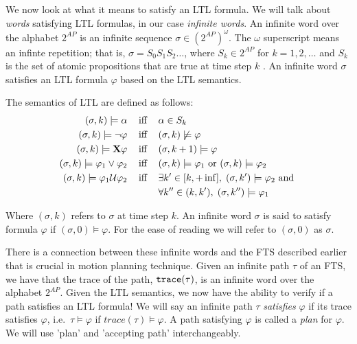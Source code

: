 We now look at what it means to satisfy an LTL formula. We will talk about \textit{words} satisfying LTL formulas, in our case \textit{infinite words}. An infinite word over the alphabet $2^{AP}$ is an infinite sequence $\sigma \in (2^{AP})^\omega$. The $\omega$ superscript means an infinte repetition; that is, $\sigma = S_0 S_1 S_2 \dots$, where $S_k \in 2^{AP}$ for $k=1,2,\dots$ and $S_k$ is the set of atomic propositions that are true at time step $k$ \cite{guo15}. An infinite word $\sigma$ satisfies an LTL formula $\varphi$ based on the LTL semantics.  

\theoremstyle{definition}
\begin{definition}
\label{defLTLS}
The semantics of LTL are defined as follows:
\begin{align*}
(\sigma,k) \models \alpha \hspace{0.3cm}\text{ iff }\hspace{0.3cm}& \alpha \in S_k \\
(\sigma,k) \models \neg \varphi \hspace{0.3cm}\text{ iff }\hspace{0.3cm}& (\sigma, k) \not \models \varphi \\
(\sigma,k) \models \textbf{X} \varphi \hspace{0.3cm}\text{ iff }\hspace{0.3cm}& (\sigma, k+1) \models \varphi \\
(\sigma,k) \models \varphi_1 \lor \varphi_2 \hspace{0.3cm}\text{ iff }\hspace{0.3cm}& (\sigma,k) \models \varphi_1 \text{ or } (\sigma,k) \models \varphi_2 \\
(\sigma,k) \models \varphi_1 \mathcal{U} \varphi_2 \hspace{0.3cm}\text{ iff }\hspace{0.3cm}& \exists k' \in [k,+\inf ], \hspace{0.1cm} (\sigma ,k') \models \varphi_2 \text{ and } \\ &\forall k'' \in (k,k'), \hspace{0.1cm} (\sigma, k'') \models \varphi_1 
\end{align*}
\end{definition}
Where $(\sigma,k)$  refers to $\sigma$ at time step $k$. An infinite word $\sigma$ is said to satisfy formula $\varphi$ if $(\sigma,0) \models \varphi$. For the ease of reading we will refer to $(\sigma,0)$ as $\sigma$. 

There is a connection between these infinite words and the FTS described earlier that is crucial in motion planning technique. Given an infinite path $\tau$ of an FTS, we have that the trace of the path, $\texttt{trace}(\tau)$, is an infinite word over the alphabet $2^{AP}$. Given the LTL semantics, we now have the ability to verify if a path satisfies an LTL formula! We will say an infinite path $\tau$ \textit{satisfies} $\varphi$ if its trace satisfies $\varphi$, i.e.\ $\tau \models \varphi$ if $trace(\tau) \models \varphi$. A path satisfying $\varphi$ is called a \textit{plan} for $\varphi$. We will use 'plan' and 'accepting path' interchangeably.




